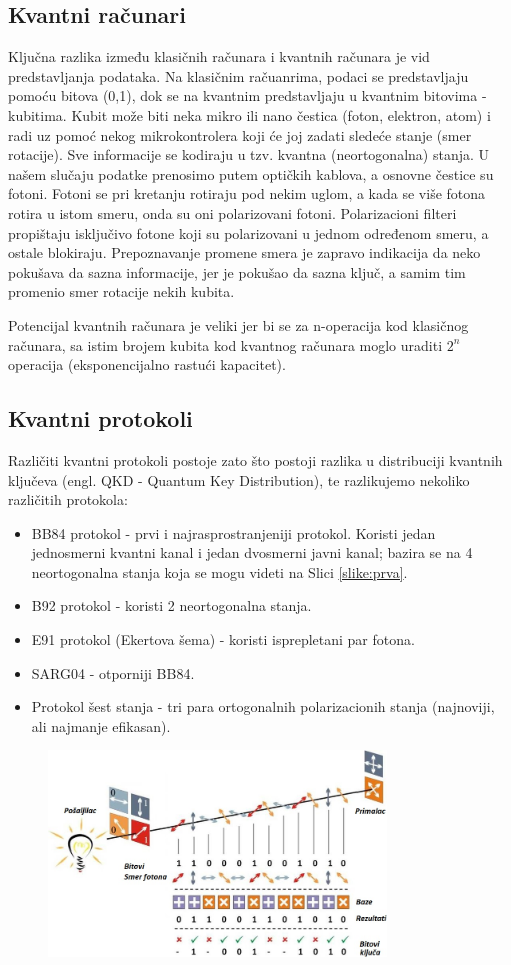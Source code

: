 \documentclass[a4paper]{article}
\begin{document}
{\subsection{Kvantni računari}
Ključna razlika između klasičnih računara i kvantnih računara je vid predstavljanja podataka. Na klasičnim račuanrima, podaci se predstavljaju pomoću bitova (0,1), dok se na kvantnim predstavljaju u kvantnim bitovima - kubitima. Kubit može biti neka mikro ili nano čestica (foton, elektron, atom) i radi uz pomoć nekog mikrokontrolera koji će joj zadati sledeće stanje (smer rotacije). Sve informacije se kodiraju u tzv. kvantna (neortogonalna) stanja. U našem slučaju podatke prenosimo putem optičkih kablova, a osnovne čestice su fotoni. Fotoni se pri kretanju rotiraju pod nekim uglom, a kada se više fotona rotira u istom smeru, onda su oni polarizovani fotoni. Polarizacioni filteri propištaju isključivo fotone koji su polarizovani u jednom određenom smeru, a ostale blokiraju. Prepoznavanje promene smera je zapravo indikacija da neko pokušava da sazna informacije, jer je pokušao da sazna ključ, a samim tim promenio smer rotacije nekih kubita.


Potencijal kvantnih računara je veliki jer bi se za n-operacija kod klasičnog računara, sa istim brojem kubita kod kvantnog računara moglo uraditi $ 2^{n} $ operacija (eksponencijalno rastući kapacitet). 
\subsection{Kvantni protokoli}
\label{qkd}
Različiti kvantni protokoli\cite{stjepankvantna} postoje zato što postoji razlika u distribuciji kvantnih ključeva (engl. QKD - Quantum Key Distribution), te razlikujemo nekoliko različitih protokola:
\begin{itemize}
\item BB84 protokol - prvi i najrasprostranjeniji protokol. Koristi jedan jednosmerni kvantni kanal i jedan dvosmerni javni kanal; bazira se na 4 neortogonalna stanja koja se mogu videti na Slici \ref{slike:prva}. 
\item B92 protokol - koristi 2 neortogonalna stanja.
\item E91 protokol (Ekertova šema) - koristi isprepletani par fotona.
\item SARG04 - otporniji BB84.
\item Protokol šest stanja  - tri para ortogonalnih polarizacionih stanja (najnoviji, ali najmanje efikasan).
\end{itemize}
\begin{figure}[h]
\centering
\includegraphics[width=0.8\textwidth]{bb84.jpg}


\end{figure}}
\end{document}
